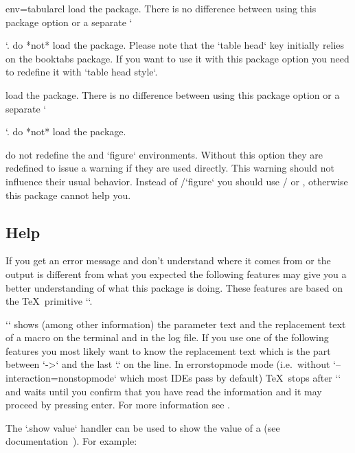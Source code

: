 \begin{tableobject}{env=tabular}{cl}
 load the  package.
  There is no difference between using this package option or a separate `\usepackage{booktabs}`.
 do *not* load the  package.
  Please note that the `table head` key initially relies on the booktabs package.
  If you want to use it with this package option you need to redefine it with `table head style`.

 load the  package.
  There is no difference between using this package option or a separate `\usepackage{longtable}`.
 do *not* load the  package.

 do not redefine the  and `figure` environments.
  Without this option they are redefined to issue a warning if they are used directly.
  This warning should not influence their usual behavior.
  Instead of \slash `figure` you should use \slash {} or ,
  otherwise this package cannot help you.
\endpkgoptndoc


\subsection{Help}
\label{help}

If you get an error message and don't understand where it comes from
or the output is different from what you expected
the following features may give you a better understanding of what this package is doing.
These features are based on the \TeX\ primitive `\show`.

\DescribeMacro{\show}
`\show` shows (among other information) the parameter text and the replacement text of a macro on the terminal and in the log file.
If you use one of the following features you most likely want to know the replacement text which is the part between `->` and the last `.` on the line.
In errorstopmode mode (i.e.\ without `--interaction=nonstopmode` which most IDEs pass by default) \TeX\ stops after `\show` and waits until you confirm that you have read the information and it may proceed by pressing enter.
For more information see .

The `.show value` handler can be used to show the value of a 
(see  documentation~\autocite[section~87.4.9 ]{tikz}).
For example:


\end{tableobject}
